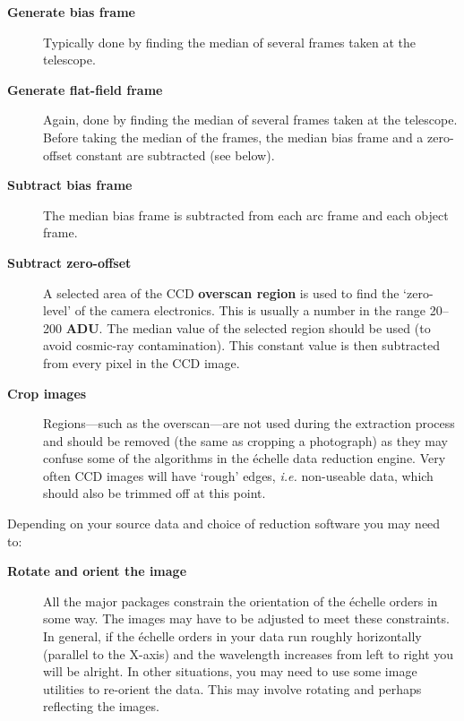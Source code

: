 \documentclass[twoside,11pt]{article}
\newcommand{\htmlref}[2]{#1}
\newcommand{\sgspec}[2]{#1}
\newcommand{\sgspec}[2]{#2}
\begin{document}
\begin{description}

\item [{\bf Generate \htmlref{bias frame}{gl_bias_frame}}]
      Typically done by finding the median of several frames taken at
      the telescope.

\item [{\bf Generate \htmlref{flat-field frame}{gl_flat_field}}]
      Again, done by finding the median of several frames taken at
      the telescope.  Before taking the median of the frames, the
      median bias frame and a zero-offset constant are subtracted
      (see below).

\item [{\bf Subtract bias frame}]
      The median bias frame is subtracted from each arc frame and
      each object frame.

\item [{\bf Subtract zero-offset}]
      A selected area of the CCD \htmlref{{\bf overscan region}}{gl_overscan}
      is used to find the
      `zero-level' of the camera electronics.  This is usually a number
      in the range 20\sgspec{--}{-}200 \htmlref{{\bf ADU}}{gl_adu}\@.
      The median value of the selected region
      should be used (to avoid cosmic-ray contamination).  This constant
      value is then subtracted from every pixel in the CCD image.

\item [{\bf Crop images}]
      Regions\sgspec{---}{ - }such as the overscan\sgspec{---}{ - }are
      not used during the extraction
      process and should be removed (the same as cropping a photograph)
      as they may confuse some of the algorithms in the \'{e}chelle data
      reduction engine.  Very often CCD images will have `rough' edges,
      {\em i.e.} non-useable data, which should also be trimmed off at
      this point.

\end{description}

Depending on your source data and choice of reduction software you may
need to:

\begin{description}

\item [{\bf Rotate and orient the image}]
      All the major packages constrain the orientation of the \'{e}chelle
      orders in some way.  The images may have to be adjusted to meet
      these constraints.
      In general, if the \'{e}chelle orders in your data run roughly
      horizontally (parallel to the X-axis) and the wavelength increases
      from left to right you will be alright.
      In other situations, you may need to use some image utilities to
      re-orient the data.
      This may involve rotating and perhaps reflecting the images.

\end{description}
\end{document}
